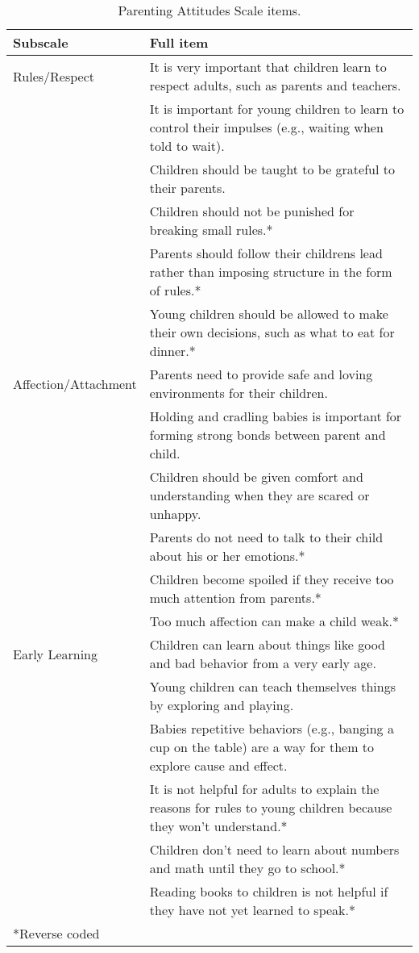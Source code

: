 \documentclass[10pt, letterpaper]{article}
\begin{document}
\begin{table*}[h]
\centering
\begin{tabular}{p{1.25in}p{5.25in}}
  \hline
Subscale & Full item \\ 
  \hline
Rules/Respect & It is very important that children learn to respect adults, such as parents and teachers. \\ 
   & It is important for young children to learn to control their impulses (e.g., waiting when told to wait). \\ 
  & Children should be taught to be grateful to their parents. \\ 
  & Children should not be punished for breaking small rules.* \\ 
  & Parents should follow their childrens lead rather than imposing structure in the form of rules.* \\ 
  & Young children should be allowed to make their own decisions, such as what to eat for dinner.* \\ 
  \hline
  Affection/Attachment & Parents need to provide safe and loving environments for their children. \\ 
   & Holding and cradling babies is important for forming strong bonds between parent and child. \\ 
   & Children should be given comfort and understanding when they are scared or unhappy. \\ 
   & Parents do not need to talk to their child about his or her emotions.* \\ 
   & Children become spoiled if they receive too much attention from parents.* \\ 
   & Too much affection can make a child weak.* \\ 
   \hline
  Early Learning & Children can learn about things like good and bad behavior from a very early age. \\ 
   & Young children can teach themselves things by exploring and playing. \\ 
   & Babies repetitive behaviors (e.g., banging a cup on the table) are a way for them to explore cause and effect. \\ 
   & It is not helpful for adults to explain the reasons for rules to young children because they won't understand.* \\ 
   & Children don't need to learn about numbers and math until they go to school.* \\ 
   & Reading books to children is not helpful if they have not yet learned to speak.* \\ 
   \hline
   *Reverse coded
\end{tabular}
\caption{Parenting Attitudes Scale items.\label{tab:items}} 
\end{table*}
\end{document}
